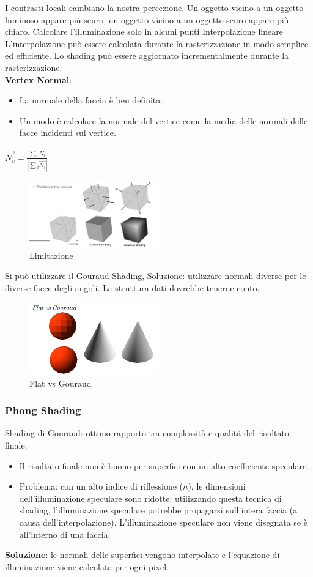 I contrasti locali cambiano la nostra percezione.
Un oggetto vicino a un oggetto luminoso appare più scuro, un oggetto vicino a un oggetto scuro appare più chiaro.
Calcolare l'illuminazione solo in alcuni punti Interpolazione lineare
L'interpolazione può essere calcolata durante la rasterizzazione in modo semplice ed efficiente.
Lo shading può essere aggiornato incrementalmente durante la rasterizzazione.\\
\textbf{Vertex Normal}:
\begin{itemize}
    \item La normale della faccia è ben definita.
    \item Un modo è calcolare la normale del vertice come la media delle normali delle facce incidenti sul vertice.
\end{itemize}
$\vec{N_v}=\frac{ \sum_{i}{}\vec{N_i} }{| \sum{_i}{}\vec{N_i} |}$ \\
\begin{figure}[H]
    \centering
    \includegraphics[width=0.5\textwidth]{images/AngleProblems.png} 
    \caption{Limitazione }
    \label{fig:immagine}
\end{figure}
Si può utilizzare il Gouraud Shading, Soluzione: utilizzare normali diverse per le diverse facce degli angoli.
La struttura dati dovrebbe tenerne conto.
\begin{figure}[H]
    \centering
    \includegraphics[width=0.5\textwidth]{images/FlatvsGround.png} 
    \caption{Flat vs Gouraud }
    \label{fig:immagine}
\end{figure}
\subsubsection{Phong Shading}
Shading di Gouraud: ottimo rapporto tra complessità e qualità del risultato finale.
\begin{itemize}
    \item Il risultato finale non è buono per superfici con un alto coefficiente speculare.
    \item Problema: con un alto indice di riflessione ($n$), le dimensioni dell'illuminazione speculare sono ridotte; utilizzando questa tecnica di shading, l'illuminazione speculare potrebbe propagarsi sull'intera faccia (a causa dell'interpolazione). L'illuminazione speculare non viene disegnata se è all'interno di una faccia.
\end{itemize}
\textbf{Soluzione}: le normali delle superfici vengono interpolate e l'equazione di illuminazione viene calcolata per ogni pixel.